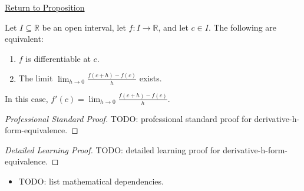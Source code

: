 \newpage
{}
\label{prf:derivative-h-form-equivalence}

\begin{remark*}[Return]
\hyperref[prop:derivative-h-form-equivalence]{Return to Proposition}
\end{remark*}

\begin{proposition*}
Let $I \subseteq \mathbb{R}$ be an open interval, let $f : I \to \mathbb{R}$, and let $c \in I$. The following are equivalent:
\begin{enumerate}
\item $f$ is differentiable at $c$.
\item The limit $\displaystyle\lim_{h \to 0} \frac{f(c + h) - f(c)}{h}$ exists.
\end{enumerate}
In this case, $\displaystyle f'(c) = \lim_{h \to 0} \frac{f(c + h) - f(c)}{h}$.
\end{proposition*}

\begin{proof}[Professional Standard Proof]
\LRAProofBodyStart
TODO: professional standard proof for derivative-h-form-equivalence.
\end{proof}

\begin{proof}[Detailed Learning Proof]
\LRAProofBodyStart
TODO: detailed learning proof for derivative-h-form-equivalence.
\end{proof}

\begin{remark*}
\end{remark*}

\begin{dependencies}
\begin{itemize}
  \item TODO: list mathematical dependencies.
\end{itemize}
\end{dependencies}

\clearpage

